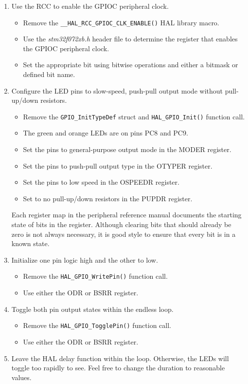 \documentclass[11pt,fleqn]{book} %
\begin{document}
\begin{enumerate}
    
    \item Use the RCC to enable the GPIOC peripheral clock.
    \begin{itemize}
        \item Remove the \texttt{\_\_HAL\_RCC\_GPIOC\_CLK\_ENABLE()} HAL library macro.
        \item Use the \textit{stm32f072xb.h} header file to determine the register that enables the GPIOC peripheral clock.
        \item Set the appropriate bit using bitwise operations and either a bitmask or defined bit name. 
    \end{itemize}
    \item Configure the LED pins to slow-speed, push-pull output mode without pull-up/down resistors.
    \begin{itemize}
        \item Remove the \texttt{GPIO\_InitTypeDef} struct and \texttt{HAL\_GPIO\_Init()} function call.
        \item The green and orange LEDs are on pins PC8 and PC9.
        \item Set the pins to general-purpose output mode in the MODER register. 
        \item Set the pins to push-pull output type in the OTYPER register.
        \item Set the pins to low speed in the OSPEEDR register. 
        \item Set to no pull-up/down resistors in the PUPDR register. 
    \end{itemize}

    Each register map in the peripheral reference manual documents the starting state of bits in the register. Although clearing bits that should already be zero is not always necessary, it is good style to ensure that every bit is in a known state.  
    \medskip

    \item Initialize one pin logic high and the other to low.
    \begin{itemize}
        \item Remove the \texttt{HAL\_GPIO\_WritePin()} function call.
        \item Use either the ODR or BSRR register.  
    \end{itemize}
    \item Toggle both pin output states within the endless loop.
    \begin{itemize}
        \item Remove the \texttt{HAL\_GPIO\_TogglePin()} function call.
        \item Use either the ODR or BSRR register. 
    \end{itemize}
    \item Leave the HAL delay function within the loop. Otherwise, the LEDs will toggle too rapidly to see. Feel free to change the duration to reasonable values.
\end{enumerate}
\end{document}
